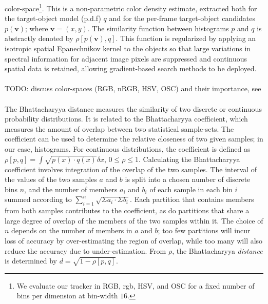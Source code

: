 \documentclass[a4paper,11pt]{article}
\newcommand{\tbf}{\textbf}
\begin{document}
		color-space\footnote{We evaluate our tracker in RGB, rgb, HSV, and OSC for a
		fixed number of bins per dimension at bin-width $16$.}. This is a non-parametric
		color density estimate, extracted both for the target-object model (p.d.f) $q$
		and for the per-frame target-object candidates $p(\tbf{v})$; where $\tbf{v} = (x, y)$.
		The similarity function between histograms $p$ and $q$ is abstractly denoted by
		$\rho[p(\tbf{v}), q]$. This function is regularized by applying an isotropic spatial
		Epanechnikov kernel to the objects so that large variations in spectral information
		for adjacent image pixels are suppressed and continuous spatial data is retained,
		allowing gradient-based search methods to be deployed.
		\\ \\
		TODO: discuss color-spaces (RGB, nRGB, HSV, OSC) and their importance, see \cite{COLOR}
		\\ \\
		The Bhattacharyya distance measures the similarity of two discrete or continuous
		probability distributions. It is related to the Bhattacharyya coefficient, which
		measures the amount of overlap between two statistical sample-sets. The coefficient
		can be used to determine the relative closeness of two given samples; in our case,
		histograms. For continuous distributions, the coefficient is defined as
		$\rho[p, q] = \int \sqrt{p(x) \cdot q(x) } \delta x$, $0 \leq \rho \leq 1$.
		Calculating the Bhattacharyya coefficient involves integration of the overlap
		of the two samples. The interval of the values of the two samples $a$ and $b$
		is split into a chosen number of discrete bins $n$, and the number of members
		$a_i$ and $b_i$ of each sample in each bin $i$ summed according to
		$\sum_{i=1}^{n} \sqrt{\Sigma a_i \cdot \Sigma b_i}$. Each partition that contains
		members from both samples contributes to the coefficient, as do partitions that
		share a large degree of overlap of the members of the two samples  within it. The
		choice of $n$ depends on the number of members in $a$ and $b$; too few partitions
		will incur loss of accuracy by over-estimating the region of overlap, while too many
		will also reduce the accuracy due to under-estimation. From $\rho$, the Bhattacharyya
		\textit{distance} is determined by $d = \sqrt{1 - \rho[p, q]}$.
\end{document}
